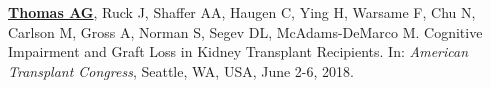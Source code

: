 \documentclass[10pt]{article}
\makeatletter
\newlength{\bibhang}
\newlength{\bibsep}
 {\@listi \global\bibsep\itemsep \global\advance\bibsep by\parsep}
\newenvironment{bibenum*}
  {\renewcommand\labelenumi{[\theenumi]}%
   \etaremune[
     topsep=0pt,
     itemsep=\bibsep,
     parsep=0pt,partopsep=0pt,
     itemindent=-\bibhang,
     leftmargin={\bibhang+\widthof{[999]}}]}
  {\endetaremune}
\makeatother
\begin{document}
\begin{bibenum*}


\item \underline{\textbf{Thomas AG}}, Ruck J, Shaffer AA, Haugen C,
  Ying H, Warsame F, Chu N, Carlson M, Gross A, Norman S, Segev DL,
  McAdams-DeMarco M.
  Cognitive Impairment and Graft Loss in Kidney Transplant Recipients.
  In: \emph{American Transplant Congress},
  Seattle, WA, USA, June 2-6, 2018.






\end{bibenum*}
\end{document}
